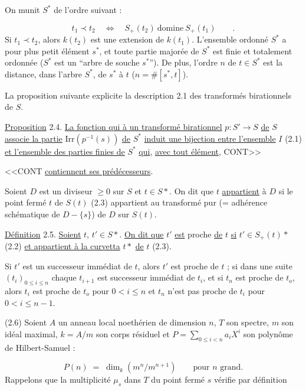 On munit $S^*$ de l'ordre suivant :

\begin{equation*}
t_1 \prec t_2 \quad \Longleftrightarrow \quad S_+(t_2) \ \mbox{domine} \ S_+(t_1) \qquad .
\end{equation*}
Si $t_1 \prec t_2$, alors $k(t_2)$ est une extension de $k(t_1)$. L'ensemble ordonné $S^*$ a pour plus petit élément $s^*$, et toute partie majorée de $S^*$ est finie et totalement ordonnée ($S^*$ est un ``arbre de souche $s^*$''). De plus, l'ordre $n$ de $t \in S^*$ est la distance, dans l'arbre $S^*$, de $s^*$ à $t$ ($n = \#[s^*,t]$).

La proposition suivante explicite la description 2.1 des transformés birationnels de $S$.

\underline{Proposition} 2.4. \underline{La fonction qui à un transformé birationnel} $p : S' \to S$ \underline{de} $S$ \underline{associe la partie} $\mathrm{Irr}(p^{-1}(s))$ \underline{de} $S^*$ \underline{induit une bijection entre l'ensemble} $I$ (2.1) \underline{et l'ensemble des parties finies de} $S^*$ \underline{qui}, \underline{avec tout élément}, CONT>>



<<CONT \underline{contiennent ses prédécesseurs}.

Soient $D$ est un diviseur $\geq 0$ sur $S$ et $t \in S*$. On dit que $t$ \underline{appartient} à $D$ si le point fermé $t$ de $S(t)$ (2.3) appartient au transformé pur (= adhérence schématique de $D - \{s\}$) de $D$ sur $S(t)$.

\underline{Définition} 2.5. \underline{Soient} $t$, $t' \in S*$. \underline{On dit que} $t'$ \underline{est} proche \underline{de} $t$ \underline{si} $t' \in S_+(t)*$ (2.2) \underline{et appartient à la curvetta} $t*$ \underline{de} $t$ (2.3).

Si $t'$ est un successeur immédiat de $t$, alors $t'$ est proche de $t$ ; si dans une suite $(t_i)_{0 \leq i \leq n}$ chaque $t_{i+1}$ est successeur immédiat de $t_i$, et si $t_n$ est proche de $t_o$, alors $t_i$ est proche de $t_o$ pour $0 < i \leq n$ et $t_n$ n'est pas proche de $t_i$ pour $0 < i \leq n-1$.

(2.6)  Soient $A$ un anneau local noethérien de dimension $n$, $T$ son spectre, $m$ son idéal maximal, $k = A/m$ son corps résiduel et $P = \sum_{0 \leq i < n} a_i X^i$ son polynôme de Hilbert-Samuel :

\begin{equation*}
P(n) \;=\; \dim_k(m^n/m^{n+1}) \qquad \text{pour } n \text{ grand.}
\end{equation*}
Rappelons que la multiplicité $\mu_s$ dans $T$ du point fermé $s$ vérifie par définition

